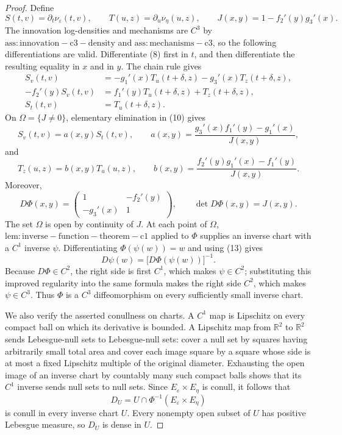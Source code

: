 \documentclass{article}
\begin{document}
\begin{proof}
Define
\[
 S(t,v)=\partial_t\nu_\varepsilon(t,v),
 \qquad T(u,z)=\partial_u\nu_\eta(u,z),
 \qquad J(x,y)=1-f_2'(y)g_3'(x).
\tag{9}
\]
The innovation log-densities and mechanisms are \(C^3\) by \(\mathrm{ass:innovation-c3-density}\) and \(\mathrm{ass:mechanisms-c3}\), so the following differentiations are valid.  Differentiate (8) first in \(t\), and then differentiate the resulting equality in \(x\) and in \(y\).  The chain rule gives
\[
 \begin{aligned}
 S_v(t,v)&=-g_1'(x)T_u(t+\delta,z)-g_3'(x)T_z(t+\delta,z),\\
 -f_2'(y)S_v(t,v)&=f_1'(y)T_u(t+\delta,z)+T_z(t+\delta,z),\\
 S_t(t,v)&=T_u(t+\delta,z).
 \end{aligned}
\tag{10}
\]
On \(\Omega=\{J\ne0\}\), elementary elimination in (10) gives
\[
 S_v(t,v)=a(x,y)S_t(t,v),
 \qquad
 a(x,y)=\frac{g_3'(x)f_1'(y)-g_1'(x)}{J(x,y)},
\tag{11}
\]
and
\[
 T_z(u,z)=b(x,y)T_u(u,z),
 \qquad
 b(x,y)=\frac{f_2'(y)g_1'(x)-f_1'(y)}{J(x,y)}.
\tag{12}
\]
Moreover,
\[
 D\Phi(x,y)=
 \begin{pmatrix}1&-f_2'(y)\\-g_3'(x)&1\end{pmatrix},
 \qquad \det D\Phi(x,y)=J(x,y).
\tag{13}
\]
The set \(\Omega\) is open by continuity of \(J\).  At each point of \(\Omega\), \(\mathrm{lem:inverse-function-theorem-c1}\) applied to \(\Phi\) supplies an inverse chart with a \(C^1\) inverse \(\psi\).  Differentiating \(\Phi(\psi(w))=w\) and using (13) gives
\[
 D\psi(w)=\bigl[D\Phi(\psi(w))\bigr]^{-1}.
\]
Because \(D\Phi\in C^2\), the right side is first \(C^1\), which makes \(\psi\in C^2\); substituting this improved regularity into the same formula makes the right side \(C^2\), which makes \(\psi\in C^3\).  Thus \(\Phi\) is a \(C^3\) diffeomorphism on every sufficiently small inverse chart.

We also verify the asserted conullness on charts.  A \(C^1\) map is Lipschitz on every compact ball on which its derivative is bounded.  A Lipschitz map from \(\mathbb R^2\) to \(\mathbb R^2\) sends Lebesgue-null sets to Lebesgue-null sets: cover a null set by squares having arbitrarily small total area and cover each image square by a square whose side is at most a fixed Lipschitz multiple of the original diameter.  Exhausting the open image of an inverse chart by countably many such compact balls shows that its \(C^1\) inverse sends null sets to null sets.  Since \(E_\varepsilon\times E_\eta\) is conull, it follows that
\[
 D_U=U\cap\Phi^{-1}(E_\varepsilon\times E_\eta)
\]
is conull in every inverse chart \(U\).  Every nonempty open subset of \(U\) has positive Lebesgue measure, so \(D_U\) is dense in \(U\).


\end{proof}
\end{document}
